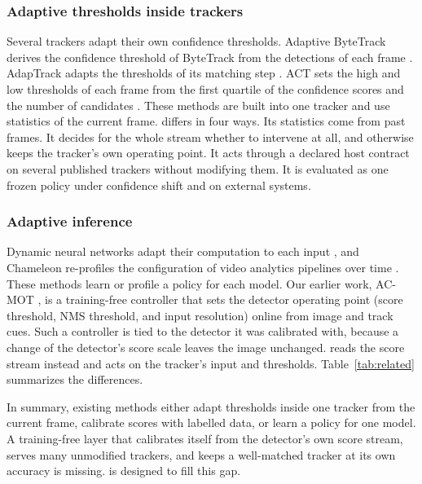 \subsubsection{Adaptive thresholds inside trackers}
Several trackers adapt their own confidence thresholds. Adaptive ByteTrack
derives the confidence threshold of ByteTrack from the detections of each
frame \cite{ma2023adaptivebytetrack}. AdapTrack adapts the thresholds of its
matching step \cite{shim2024adaptrack}. ACT sets the high and low thresholds
of each frame from the first quartile of the confidence scores and the number
of candidates \cite{act2026adaptive}. These methods are built into one tracker
and use statistics of the current frame. \scl{} differs in
four ways. Its statistics come from past frames. It decides for the whole
stream whether to intervene at all, and otherwise keeps the tracker's own
operating point. It acts through a declared host contract on several
published trackers without modifying them. It is evaluated as one frozen
policy under confidence shift and on external systems.

\subsubsection{Adaptive inference}
Dynamic neural networks adapt their computation to each input
\cite{han2022dynamic}, and Chameleon re-profiles the configuration of video
analytics pipelines over time \cite{jiang2018chameleon}. These methods learn or
profile a policy for each model. Our earlier work, AC-MOT \cite{ismail2026acmot},
is a training-free controller that sets the detector operating point (score
threshold, NMS threshold, and input resolution) online from image and track
cues. Such a controller is tied to the detector it was calibrated with,
because a change of the detector's score scale leaves the image unchanged.
\scl{} reads the score stream instead and acts on the
tracker's input and thresholds. Table~\ref{tab:related} summarizes the
differences.

In summary, existing methods either adapt thresholds inside one tracker from
the current frame, calibrate scores with labelled data, or learn a policy for
one model. A training-free layer that calibrates itself from the detector's
own score stream, serves many unmodified trackers, and keeps a well-matched
tracker at its own accuracy is missing. \scl{} is designed to fill this gap.

